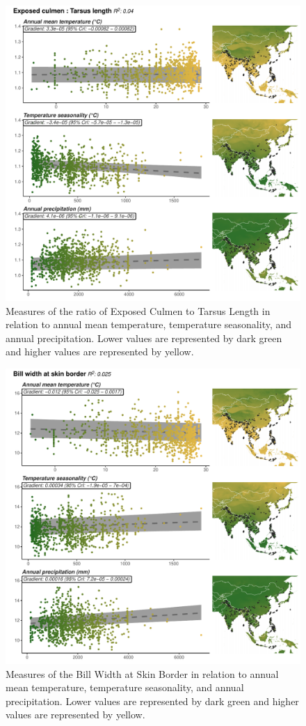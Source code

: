 \documentclass[10pt,a4paper]{article}
\begin{document}
\begin{figure}
\includegraphics[width=0.9\linewidth]{../Figures/climMap_ExCu.TaLe} \caption{Measures of the ratio of Exposed Culmen to Tarsus Length in relation to annual mean temperature, temperature seasonality, and annual precipitation. Lower values are represented by dark green and higher values are represented by yellow.}\label{fig:climateComparisonMapExCuTaLe}
\end{figure}

\begin{figure}
\includegraphics[width=0.9\linewidth]{../Figures/climMap_Bill.width.at.skin.border} \caption{Measures of the Bill Width at Skin Border in relation to annual mean temperature, temperature seasonality, and annual precipitation. Lower values are represented by dark green and higher values are represented by yellow.}\label{fig:climateComparisonMapBiWiSkBo}
\end{figure}
\end{document}
